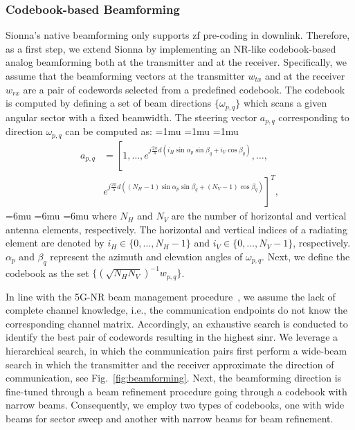 \subsubsection{Codebook-based Beamforming}
Sionna's native beamforming only supports \gls{zf} pre-coding in downlink. Therefore, as a first step, we extend Sionna by implementing an NR-like codebook-based analog beamforming both at the transmitter and at the receiver.
Specifically, we assume that the beamforming vectors at the transmitter $w_{tx}$ and at the receiver $w_{rx}$ are a pair of codewords selected from a predefined codebook. The codebook is computed by defining a set of beam directions $\{ \omega_{p,q} \}$ which scans a given angular sector with a fixed beamwidth. The steering vector $a_{p,q}$ corresponding to direction $\omega_{p, q}$ can be computed as:
\medmuskip=1mu
\thinmuskip=1mu
\thickmuskip=1mu
\begin{equation}
    \begin{aligned}
            a_{p,q} &= \left[ 1,\ldots, e^{j\frac{2\pi}{\lambda}d\left(i_{ H}\sin\alpha_p\sin\beta_q+i_{V}\cos\beta_q\right)}, \ldots,  \right. \\ 
            & \left. e^{j\frac{2\pi}{\lambda}d\left((N_{H}-1)\sin\alpha_p\sin\beta_q + (N_{ V}-1)\cos\beta_q\right)} \right] ^T,
    \end{aligned}
\end{equation}
\medmuskip=6mu
\thinmuskip=6mu
\thickmuskip=6mu
where $N_{H}$ and $N_{V}$ are the number of horizontal and vertical antenna elements, respectively. The horizontal and vertical indices of a radiating element are denoted by $i_{H}\in \{0, \ldots, N_{H} - 1 \}$ and $i_{V}\in \{0, \ldots, N_{V} - 1\}$, respectively. $\alpha_p$ and $\beta_q$ represent the azimuth and elevation angles of $\omega_{p, q}$. Next, we define the codebook as the set $\{ \left( \sqrt{N_{H} N_{V}} \right)^{-1} w_{p, q} \}$. 

In line with the 5G-NR beam management procedure~\cite{giordani2018tutorial}, we assume the lack of complete channel knowledge, i.e., the communication endpoints do not know the corresponding channel matrix. Accordingly, an exhaustive search is conducted to identify the best pair of codewords resulting in the highest \gls{sinr}. We leverage a hierarchical search, in which the communication pairs first perform a wide-beam search
in which the transmitter and the receiver approximate the direction of communication, see Fig.~\ref{fig:beamforming}. Next, the beamforming direction is fine-tuned through a beam refinement procedure going through a codebook with narrow beams. Consequently, we employ two types of codebooks, one with wide beams for sector sweep and another with narrow beams for beam refinement.   


